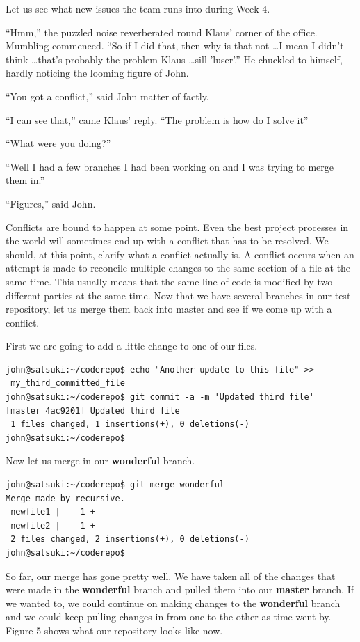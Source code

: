 Let us see what new issues the team runs into during Week 4.

\begin{trenches}
``Hmm,'' the puzzled noise reverberated round Klaus' corner of the office.
Mumbling commenced.
``So if I did that, then why is that not \ldots I mean I didn't think \ldots that's probably the problem Klaus \ldots sill 'luser'.''  He chuckled to himself, hardly noticing the looming figure of John.

``You got a conflict,'' said John matter of factly.

``I can see that,'' came Klaus' reply.
``The problem is how do I solve it''

``What were you doing?''

``Well I had a few branches I had been working on and I was trying to merge them in.''

``Figures,'' said John.
\end{trenches}

Conflicts are bound to happen at some point.
Even the best project processes in the world will sometimes end up with a conflict that has to be resolved.
We should, at this point, clarify what a conflict actually is.
A conflict occurs when an attempt is made to reconcile multiple changes to the same section of a file at the same time.
This usually means that the same line of code is modified by two different parties at the same time.
Now that we have several branches in our test repository, let us merge them back into master and see if we come up with a conflict.

First we are going to add a little change to one of our files.

\begin{Verbatim}
john@satsuki:~/coderepo$ echo "Another update to this file" >>
 my_third_committed_file
john@satsuki:~/coderepo$ git commit -a -m 'Updated third file'
[master 4ac9201] Updated third file
 1 files changed, 1 insertions(+), 0 deletions(-)
john@satsuki:~/coderepo$
\end{Verbatim}

Now let us merge in our \textbf{wonderful} branch.

\begin{Verbatim}
john@satsuki:~/coderepo$ git merge wonderful
Merge made by recursive.
 newfile1 |    1 +
 newfile2 |    1 +
 2 files changed, 2 insertions(+), 0 deletions(-)
john@satsuki:~/coderepo$
\end{Verbatim}

So far, our merge has gone pretty well.
We have taken all of the changes that were made in the \textbf{wonderful} branch and pulled them into our \textbf{master} branch.
If we wanted to, we could continue on making changes to the \textbf{wonderful} branch and we could keep pulling changes in from one to the other as time went by.
Figure 5 shows what our repository looks like now.

